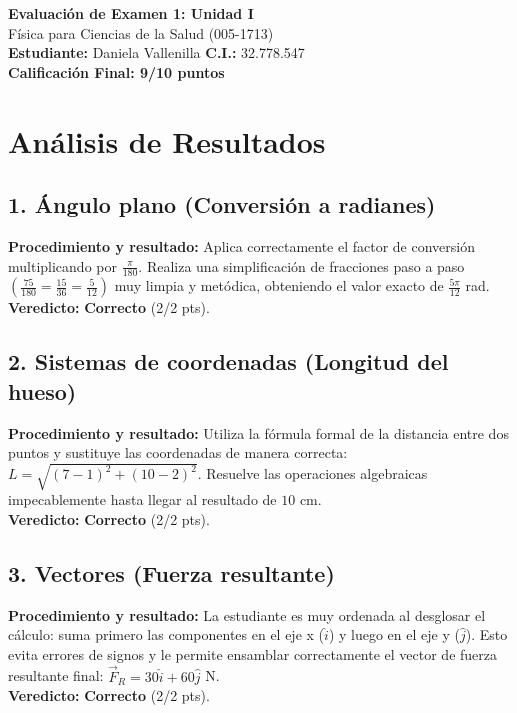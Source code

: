\documentclass[12pt]{article}
\begin{document}
\begin{center}
    \Large \textbf{Evaluación de Examen 1: Unidad I} \\
    \large Física para Ciencias de la Salud (005-1713) \\
    \vspace{0.5cm}
    \textbf{Estudiante:} Daniela Vallenilla \quad \textbf{C.I.:} 32.778.547
    \vspace{0.3cm} \\
    \large \textbf{Calificación Final: 9/10 puntos}
\end{center}

\vspace{0.5cm}

\section*{Análisis de Resultados}

\subsection*{1. Ángulo plano (Conversión a radianes)}
\textbf{Procedimiento y resultado:} Aplica correctamente el factor de conversión multiplicando por $\frac{\pi}{180}$. Realiza una simplificación de fracciones paso a paso $\left(\frac{75}{180} = \frac{15}{36} = \frac{5}{12}\right)$ muy limpia y metódica, obteniendo el valor exacto de $\frac{5\pi}{12}$ rad. \\
\textbf{Veredicto:} \textbf{Correcto} (2/2 pts).

\subsection*{2. Sistemas de coordenadas (Longitud del hueso)}
\textbf{Procedimiento y resultado:} Utiliza la fórmula formal de la distancia entre dos puntos y sustituye las coordenadas de manera correcta: $L = \sqrt{(7-1)^2 + (10-2)^2}$. Resuelve las operaciones algebraicas impecablemente hasta llegar al resultado de $10$ cm. \\
\textbf{Veredicto:} \textbf{Correcto} (2/2 pts).

\subsection*{3. Vectores (Fuerza resultante)}
\textbf{Procedimiento y resultado:} La estudiante es muy ordenada al desglosar el cálculo: suma primero las componentes en el eje x ($\hat{i}$) y luego en el eje y ($\hat{j}$). Esto evita errores de signos y le permite ensamblar correctamente el vector de fuerza resultante final: $\vec{F}_R = 30\hat{i} + 60\hat{j}$ N. \\
\textbf{Veredicto:} \textbf{Correcto} (2/2 pts).
\end{document}
